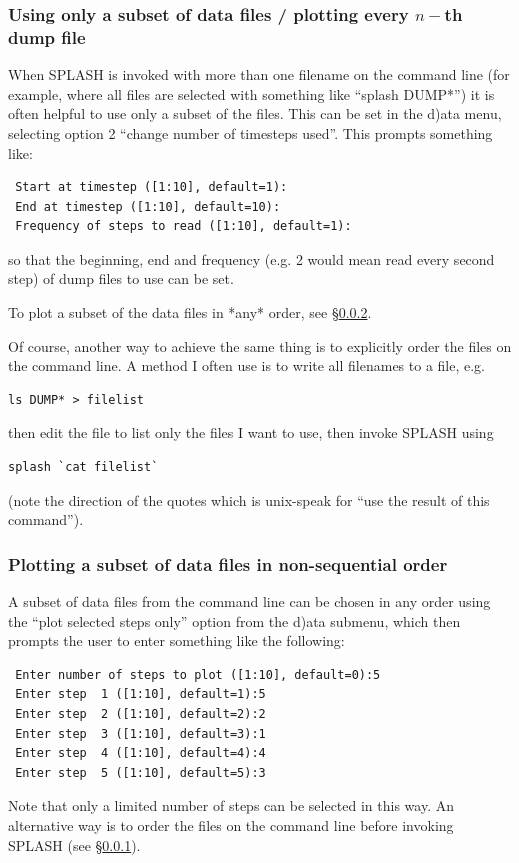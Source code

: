 \documentclass[a4paper,10pt]{article}
\newcommand{\splash}{\textsc{SPLASH }}
\begin{document}
\subsubsection{ Using only a subset of data files / plotting every $n-$th dump file}
\label{sec:subsetofsteps}
 When \splash is invoked with more than one filename on the command line (for example, where all files are selected with something like ``splash DUMP*'') it is often helpful to use only a subset of the files. This can be set in the d)ata menu, selecting option 2 ``change number of timesteps used''. This prompts something like:
\begin{verbatim}
 Start at timestep ([1:10], default=1):
 End at timestep ([1:10], default=10):
 Frequency of steps to read ([1:10], default=1):
\end{verbatim}
so that the beginning, end and frequency (e.g. 2 would mean read every second step) of dump files to use can be set.

 To plot a subset of the data files in *any* order, see \S\ref{sec:selectedstepsonly}. 

 Of course, another way to achieve the same thing is to explicitly order the files on the command line. A method I often use is to write all filenames to a file, e.g. 
\begin{verbatim}
ls DUMP* > filelist
\end{verbatim}
then edit the file to list only the files I want to use, then invoke \splash using
\begin{verbatim}
splash `cat filelist`
\end{verbatim}
(note the direction of the quotes which is unix-speak for ``use the result of this command''). 

\subsubsection{ Plotting a subset of data files in non-sequential order}
\label{sec:selectedstepsonly}
 A subset of data files from the command line can be chosen in any order using the ``plot selected steps only'' option from the d)ata submenu, which then prompts the user to enter something like the following:
\begin{verbatim}
 Enter number of steps to plot ([1:10], default=0):5
 Enter step  1 ([1:10], default=1):5
 Enter step  2 ([1:10], default=2):2
 Enter step  3 ([1:10], default=3):1
 Enter step  4 ([1:10], default=4):4
 Enter step  5 ([1:10], default=5):3
\end{verbatim}
Note that only a limited number of steps can be selected in this way. An alternative way is to order the files on the command line before invoking \splash (see \S\ref{sec:subsetofsteps}). 
\end{document}
